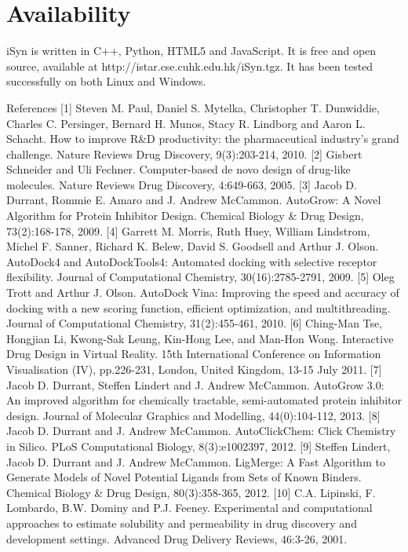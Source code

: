 \section{Availability}

iSyn is written in C++, Python, HTML5 and JavaScript. It is free and open source, available at http://istar.cse.cuhk.edu.hk/iSyn.tgz. It has been tested successfully on both Linux and Windows.

References
[1] 	Steven M. Paul, Daniel S. Mytelka, Christopher T. Dunwiddie, Charles C. Persinger, Bernard H. Munos, Stacy R. Lindborg and Aaron L. Schacht. How to improve R\&D productivity: the pharmaceutical industry's grand challenge. Nature Reviews Drug Discovery, 9(3):203-214, 2010.
[2] 	Gisbert Schneider and Uli Fechner. Computer-based de novo design of drug-like molecules. Nature Reviews Drug Discovery, 4:649-663, 2005.
[3] 	Jacob D. Durrant, Rommie E. Amaro and J. Andrew McCammon. AutoGrow: A Novel Algorithm for Protein Inhibitor Design. Chemical Biology \& Drug Design, 73(2):168-178, 2009.
[4] 	Garrett M. Morris, Ruth Huey, William Lindstrom, Michel F. Sanner, Richard K. Belew, David S. Goodsell and Arthur J. Olson. AutoDock4 and AutoDockTools4: Automated docking with selective receptor flexibility. Journal of Computational Chemistry, 30(16):2785-2791, 2009.
[5] 	Oleg Trott and Arthur J. Olson. AutoDock Vina: Improving the speed and accuracy of docking with a new scoring function, efficient optimization, and multithreading. Journal of Computational Chemistry, 31(2):455-461, 2010.
[6] 	Ching-Man Tse, Hongjian Li, Kwong-Sak Leung, Kin-Hong Lee, and Man-Hon Wong. Interactive Drug Design in Virtual Reality. 15th International Conference on Information Visualisation (IV), pp.226-231, London, United Kingdom, 13-15 July 2011.
[7] 	Jacob D. Durrant, Steffen Lindert and J. Andrew McCammon. AutoGrow 3.0: An improved algorithm for chemically tractable, semi-automated protein inhibitor design. Journal of Molecular Graphics and Modelling, 44(0):104-112, 2013.
[8] 	Jacob D. Durrant and J. Andrew McCammon. AutoClickChem: Click Chemistry in Silico. PLoS Computational Biology, 8(3):e1002397, 2012.
[9] 	Steffen Lindert, Jacob D. Durrant and J. Andrew McCammon. LigMerge: A Fast Algorithm to Generate Models of Novel Potential Ligands from Sets of Known Binders. Chemical Biology \& Drug Design, 80(3):358-365, 2012.
[10] 	C.A. Lipinski, F. Lombardo, B.W. Dominy and P.J. Feeney. Experimental and computational approaches to estimate solubility and permeability in drug discovery and development settings. Advanced Drug Delivery Reviews, 46:3-26, 2001.
